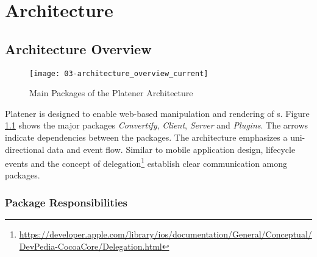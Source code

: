 \documentclass[../ClassicThesis.tex]{subfiles}
\begin{document}
\chapter{Architecture}\label{ch:architecture}

\newcommand\myNotes[1]{\textcolor{red}{#1}}

\section{Architecture Overview}

\begin{figure}
  \texttt{[image: 03-architecture\_overview\_current]}
  \caption{Main Packages of the Platener Architecture}
  \label{fig:architectureOverviewCurrent}
\end{figure}

Platener is designed to enable web-based manipulation and rendering of
{\threedmodel}s. Figure \ref{fig:architectureOverviewCurrent} shows the major
packages \emph{Convertify}, \emph{Client}, \emph{Server} and \emph{Plugins}. The
arrows indicate dependencies between the packages. The architecture emphasizes a
uni-directional data and event flow. Similar to mobile application design,
lifecycle events and the concept of
delegation\footnote{\url{https://developer.apple.com/library/ios/documentation/General/Conceptual/DevPedia-CocoaCore/Delegation.html}}
establish clear communication among packages.

\iffalse
\begin{itemize}
\item platener built on top of...
\item 4 major packages: convertify, client, server and plugins
\item optimized towards: working with 3d-models in webgl environment
\item plugin-based: allow interchangeable computation logic/ conversion methods
\item combination of lifecycle-based communication and explicit calls via
  dispatchers (related work: mobile application design, mediator pattern) \ritem
  explicit communication between packages
\end{itemize}
\fi

\subsection{Package Responsibilities}
\end{document}
